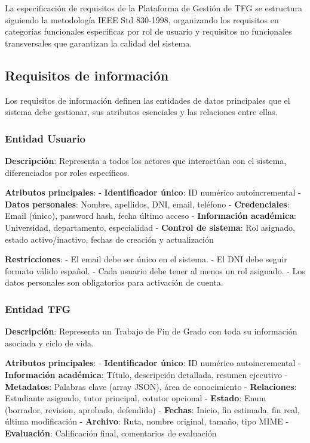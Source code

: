 \documentclass[12pt,a4paper,oneside]{report}
\begin{document}
La especificación de requisitos de la Plataforma de Gestión de TFG se
estructura siguiendo la metodología IEEE Std 830-1998, organizando los
requisitos en categorías funcionales específicas por rol de usuario y
requisitos no funcionales transversales que garantizan la calidad del
sistema.

\subsection{Requisitos de
información}\label{requisitos-de-informaciuxf3n}

Los requisitos de información definen las entidades de datos principales
que el sistema debe gestionar, sus atributos esenciales y las relaciones
entre ellas.

\subsubsection{Entidad Usuario}\label{entidad-usuario}

\textbf{Descripción}: Representa a todos los actores que interactúan con
el sistema, diferenciados por roles específicos.

\textbf{Atributos principales}: - \textbf{Identificador único}: ID
numérico autoincremental - \textbf{Datos personales}: Nombre, apellidos,
DNI, email, teléfono - \textbf{Credenciales}: Email (único), password
hash, fecha último acceso - \textbf{Información académica}: Universidad,
departamento, especialidad - \textbf{Control de sistema}: Rol asignado,
estado activo/inactivo, fechas de creación y actualización

\textbf{Restricciones}: - El email debe ser único en el sistema. - El
DNI debe seguir formato válido español. - Cada usuario debe tener al
menos un rol asignado. - Los datos personales son obligatorios para
activación de cuenta.

\subsubsection{Entidad TFG}\label{entidad-tfg}

\textbf{Descripción}: Representa un Trabajo de Fin de Grado con toda su
información asociada y ciclo de vida.

\textbf{Atributos principales}: - \textbf{Identificador único}: ID
numérico autoincremental - \textbf{Información académica}: Título,
descripción detallada, resumen ejecutivo - \textbf{Metadatos}: Palabras
clave (array JSON), área de conocimiento - \textbf{Relaciones}:
Estudiante asignado, tutor principal, cotutor opcional -
\textbf{Estado}: Enum (borrador, revision, aprobado, defendido) -
\textbf{Fechas}: Inicio, fin estimada, fin real, última modificación -
\textbf{Archivo}: Ruta, nombre original, tamaño, tipo MIME -
\textbf{Evaluación}: Calificación final, comentarios de evaluación
\end{document}
